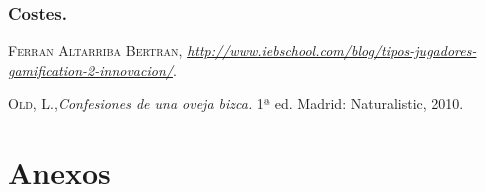 \documentclass[twoside]{report}
\begin{document}
\subsection{Costes.}

\begin{thebibliography}{a}
 \textsc{Ferran Altarriba Bertran}, \textit{\url{http://www.iebschool.com/blog/tipos-jugadores-gamification-2-innovacion/}}.  

 \textsc{Old, L.},\textit{Confesiones de una oveja bizca.} 1ª ed. Madrid: Naturalistic, 2010. 
\end{thebibliography}

\chapter{Anexos}
\end{document}
